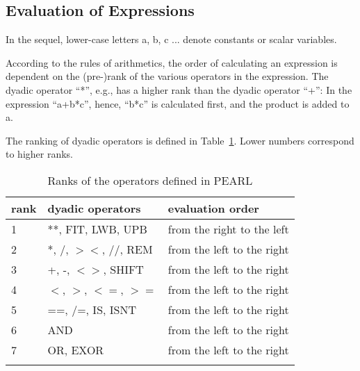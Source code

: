 \subsection{Evaluation of Expressions}   %

In the sequel, lower-case letters a, b, c ... denote constants or scalar
variables.

According to the rules of arithmetics, the order of calculating an
expression is dependent on the \mbox{(pre-)}rank of the various operators in
the expression. The dyadic operator ``*'', e.g., has a higher rank than
the dyadic operator ``+'': In the expression ``a+b*c'', hence, ``b*c''
is calculated first, and the product is added to a.

The ranking of dyadic operators is defined in Table~\ref{ranks}. Lower
numbers correspond to higher ranks.

\begin{table}
\begin{center}
\caption{Ranks of the operators defined in PEARL}
\label{ranks}
\vspace{5mm}
\begin{tabular}{|l@{\x}|l@{\x}|l|}
\hline
rank & dyadic operators       & evaluation order \\ \hline
1    & **, FIT, LWB, UPB      & from the right to the left\\
2    & *, /, $><$, //, REM    & from the left to the right\\
3    & +, -, $<>$, SHIFT      & from the left to the right\\
4    & $<$, $>$, $<=$, $>=$   & from the left to the right\\
5    & ==, /=, IS, ISNT       & from the left to the right\\
6    & AND                    & from the left to the right\\
7    & OR, EXOR               & from the left to the right\\
\hline
\index{Operator!Rank}
\index{FIT@\textbf{FIT}!Rank}
\index{LWB@\textbf{LWB}!Rank}
\index{UPB@\textbf{UPB}!Rank}
\index{CAT@\textbf{CAT}!Rank}
\index{REM@\textbf{REM}!Rank}
\index{SHIFT@\textbf{SHIFT}!Rank}
\index{CSHIFT@\textbf{CSHIFT}!Rank}
\index{IS@\textbf{IS}!Rank}
\index{ISNT@\textbf{ISNT}!Rank}
\index{AND@\textbf{AND}!Rank}
\index{OR@\textbf{OR}!Rank}
\index{LT@\textbf{LT}!Rank}
\index{LE@\textbf{LE}!Rank}
\index{GE@\textbf{GE}!Rank}
\index{EQ@\textbf{EQ}!Rank}
\index{NE@\textbf{NE}!Rank}
\index{GT@\textbf{XOR}!Rank}
\end{tabular}
\end{center}
\end{table}

